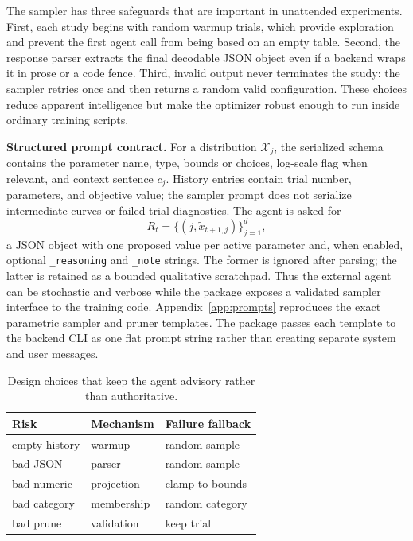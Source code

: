 \documentclass[letterpaper]{article}
\begin{document}
The sampler has three safeguards that are important in unattended experiments.
First, each study begins with random warmup trials, which provide exploration
and prevent the first agent call from being based on an empty table. Second,
the response parser extracts the final decodable JSON object even if a backend
wraps it in prose or a code fence. Third, invalid output never terminates the
study: the sampler retries once and then returns a random valid configuration.
These choices reduce apparent intelligence but make the optimizer robust enough
to run inside ordinary training scripts.

\textbf{Structured prompt contract.} For a distribution $\mathcal{X}_j$, the
serialized schema contains the parameter name, type, bounds or choices, log-scale
flag when relevant, and context sentence $c_j$. History entries contain trial
number, parameters, and objective value; the sampler prompt does not serialize
intermediate curves or failed-trial diagnostics. The agent is asked for
\begin{equation}
  R_t = \{(j,\tilde{x}_{t+1,j})\}_{j=1}^{d},
\end{equation}
a JSON object with one proposed value per active parameter and, when enabled,
optional \texttt{\_reasoning} and \texttt{\_note} strings. The former is ignored
after parsing; the latter is retained as a bounded qualitative scratchpad. Thus
the external agent can be stochastic and verbose while the package exposes a
validated sampler interface to the training code. Appendix~\ref{app:prompts}
reproduces the exact parametric sampler and pruner templates. The package passes
each template to the backend CLI as one flat prompt string rather than creating
separate system and user messages.

\begin{table}[t]
\centering
\begin{tabular}{lll}
\toprule
Risk & Mechanism & Failure fallback \\
\midrule
empty history & warmup & random sample \\
bad JSON & parser & random sample \\
bad numeric & projection & clamp to bounds \\
bad category & membership & random category \\
bad prune & validation & keep trial \\
\bottomrule
\end{tabular}
\caption{Design choices that keep the agent advisory rather than authoritative.}
\label{tab:safety}
\end{table}
\end{document}
